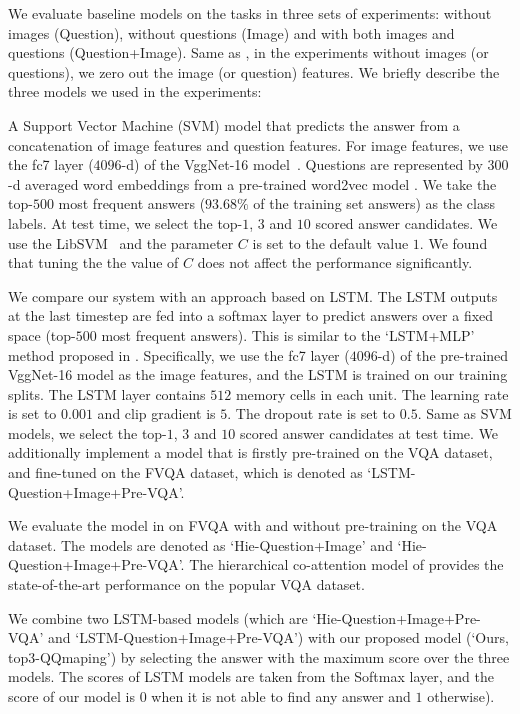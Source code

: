 \documentclass[10pt,journal]{IEEEtran}
\def\bluetext{}
\begin{document}
We evaluate baseline models on the \KBName tasks in three sets of experiments: without images (Question), without questions (Image) and with both images and questions (Question+Image). Same as \cite{zhu2015visual7w}, in the experiments without images (or questions), we zero out the image (or question) features. We briefly describe the three models we used in the experiments:

A Support Vector Machine (SVM) model that predicts the answer from a concatenation of image features and question features. For image features, we use the fc7 layer ($4096$-d) of the VggNet-16 model~\cite{simonyan2014very}. Questions are represented by $300$-d averaged word embeddings from a pre-trained word2vec model \cite{mikolov2013distributed}. We take the top-$500$ most frequent answers ($93.68\%$ of the training set answers) as the class labels. At test time, we select the top-$1$, $3$ and $10$ scored answer candidates. We use the LibSVM~\cite{chang2011libsvm} and the parameter $C$ is set to the default value $1$. { We found that tuning the the value of $C$ does not affect the performance significantly.}

\bluetext{We compare our system with an approach \cite{ren2015image} based on LSTM. The LSTM outputs at the last timestep are fed into a softmax layer to predict answers over a fixed space (top-$500$ most frequent answers). This is similar to the `LSTM+MLP' method proposed in \cite{antol2015vqa}. }Specifically, we use the fc7 layer ($4096$-d) of the pre-trained VggNet-16 model as the image features, and the LSTM is trained on our training splits. The LSTM layer contains $512$ memory cells in each unit. The learning rate is set to $0.001$ and clip gradient is $5$. The dropout rate is set to $0.5$. Same as SVM models, we select the top-$1$, $3$ and $10$ scored answer candidates at test time. { We additionally implement a model that is firstly pre-trained on the VQA dataset, and fine-tuned on the FVQA dataset, which is denoted as `LSTM-Question+Image+Pre-VQA'.}

{ 
We evaluate the model in \cite{lu2016hierarchical} on FVQA with and without pre-training on the VQA dataset. The models are denoted as `Hie-Question+Image' and `Hie-Question+Image+Pre-VQA'. The hierarchical co-attention model of \cite{lu2016hierarchical} provides the state-of-the-art performance on the popular VQA dataset.}

{ 
We combine two LSTM-based models
(which are `Hie-Question+Image+Pre-VQA' and `LSTM-Question+Image+Pre-VQA') with our proposed model (`Ours, top3-QQmaping') by selecting the answer with the maximum score over the three models. The scores of LSTM models are taken from the Softmax layer, and the score of our model is $0$ when it is not able to find any answer and $1$ otherwise).}
\end{document}
